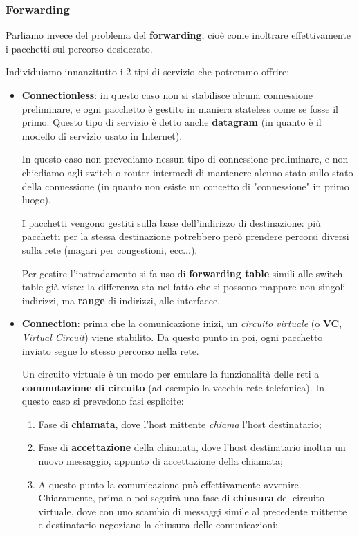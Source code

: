 \documentclass[a4paper,11pt]{article}
\begin{document}
\subsubsection{Forwarding}
Parliamo invece del problema del \textbf{forwarding}, cioè come inoltrare effettivamente i pacchetti sul percorso desiderato.

Individuiamo innanzitutto i 2 tipi di servizio che potremmo offrire:
\begin{itemize}
	\item \textbf{Connectionless}: in questo caso non si stabilisce alcuna connessione preliminare, e ogni pacchetto è gestito in maniera stateless come se fosse il primo. Questo tipo di servizio è detto anche \textbf{datagram} (in quanto è il modello di servizio usato in Internet).

		In questo caso non prevediamo nessun tipo di connessione preliminare, e non chiediamo agli switch o router intermedi di mantenere alcuno stato sullo stato della connessione (in quanto non esiste un concetto di "connessione" in primo luogo).

		I pacchetti vengono gestiti sulla base dell'indirizzo di destinazione: più pacchetti per la stessa destinazione potrebbero però prendere percorsi diversi sulla rete (magari per congestioni, ecc...).

		Per gestire l'instradamento si fa uso di \textbf{forwarding table} simili alle switch table già viste: la differenza sta nel fatto che si possono mappare non singoli indirizzi, ma \textbf{range} di indirizzi, alle interfacce.

	\item \textbf{Connection}: prima che la comunicazione inizi, un \textit{circuito virtuale} (o \textbf{VC}, \textit{Virtual Circuit}) viene stabilito. Da questo punto in poi, ogni pacchetto inviato segue lo stesso percorso nella rete.

		Un circuito virtuale è un modo per emulare la funzionalità delle reti a \textbf{commutazione di circuito} (ad esempio la vecchia rete telefonica). In questo caso si prevedono fasi esplicite:
		\begin{enumerate}
			\item Fase di \textbf{chiamata}, dove l'host mittente \textit{chiama} l'host destinatario;
			\item Fase di \textbf{accettazione} della chiamata, dove l'host destinatario inoltra un nuovo messaggio, appunto di accettazione della chiamata;
			\item A questo punto la comunicazione può effettivamente avvenire. Chiaramente, prima o poi seguirà una fase di \textbf{chiusura} del circuito virtuale, dove con uno scambio di messaggi simile al precedente mittente e destinatario negoziano la chiusura delle comunicazioni;
		\end{enumerate}


\end{itemize}
\end{document}
